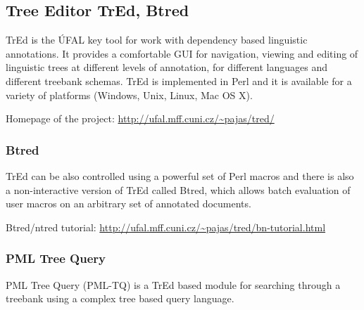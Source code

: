 %

\subsection{Tree Editor TrEd, Btred} \label{sec:third_tred}

TrEd is the ÚFAL key tool for work with dependency based linguistic annotations. It provides a comfortable GUI for navigation, viewing and editing of linguistic trees at different levels of annotation, for different languages and different treebank schemas. TrEd is implemented in Perl and it is available for a variety of platforms (Windows, Unix, Linux, Mac OS X).

\medskip
Homepage of the project: \url{http://ufal.mff.cuni.cz/~pajas/tred/}


\subsubsection{Btred}
TrEd can be also controlled using a powerful set of Perl macros and there is also a non-interactive version of TrEd called Btred, which allows batch evaluation of user macros on an arbitrary set of annotated documents.

\medskip
Btred/ntred tutorial: \url{http://ufal.mff.cuni.cz/~pajas/tred/bn-tutorial.html}


\subsubsection{PML Tree Query} \label{sec:third_pml_tree_query}
PML Tree Query (PML-TQ) \citep{biblio:PaStSystemfor2009} is a TrEd based module for searching through a treebank using a complex tree based query language.

